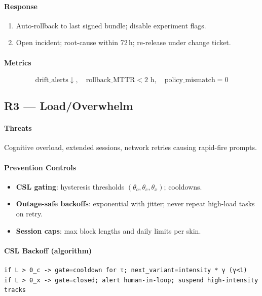 \documentclass[11pt]{article}
\theoremstyle{plain}
\begin{document}
\paragraph{Response}
\begin{enumerate}
  \item Auto-rollback to last signed bundle; disable experiment flags.
  \item Open incident; root-cause within 72\,h; re-release under change ticket.
\end{enumerate}

\paragraph{Metrics}
\[
\text{drift\_alerts} \downarrow,\quad \text{rollback\_MTTR} < 2\text{ h},\quad
\text{policy\_mismatch} = 0
\]

\subsection{R3 — Load/Overwhelm}
\paragraph{Threats}
Cognitive overload, extended sessions, network retries causing rapid-fire prompts.

\paragraph{Prevention Controls}
\begin{itemize}
  \item \textbf{CSL gating}: hysteresis thresholds $(\theta_o,\theta_c,\theta_x)$; cooldowns.
  \item \textbf{Outage-safe backoffs}: exponential with jitter; never repeat high-load tasks on retry.
  \item \textbf{Session caps}: max block lengths and daily limits per skin.
\end{itemize}

\paragraph{CSL Backoff (algorithm)}
\begin{verbatim}
if L > θ_c -> gate=cooldown for τ; next_variant=intensity * γ (γ<1)
if L > θ_x -> gate=closed; alert human-in-loop; suspend high-intensity tracks
\end{verbatim}
\end{document}
